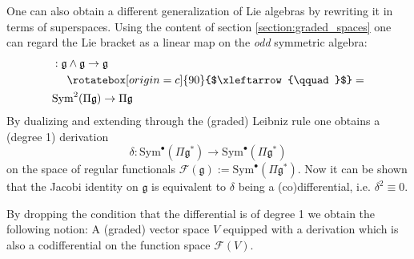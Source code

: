 	One can also obtain a different generalization of Lie algebras by rewriting it in terms of superspaces. Using the content of section \ref{section:graded_spaces} one can regard the Lie bracket as a linear map on the \textit{odd} symmetric algebra:
	\begin{align*}
		[\cdot,\cdot]&:\mathfrak{g}\wedge\mathfrak{g}\rightarrow\mathfrak{g}\\
		&\quad\ \rotatebox[origin=c]{90}{$\xleftarrow{\qquad}$}=\\
		&\text{Sym}^2(\Pi\mathfrak{g})\rightarrow\Pi\mathfrak{g}
	\end{align*}
	By dualizing and extending through the (graded) Leibniz rule one obtains a (degree 1) derivation \[\delta:\text{Sym}^\bullet(\Pi\mathfrak{g}^*)\rightarrow\text{Sym}^\bullet(\Pi\mathfrak{g}^*)\] on the space of regular functionals $\mathcal{F}(\mathfrak{g}):=\text{Sym}^\bullet(\Pi\mathfrak{g}^*)$. Now it can be shown that the Jacobi identity on $\mathfrak{g}$ is equivalent to $\delta$ being a (co)differential, i.e. $\delta^2\equiv0$.
	
	
	By dropping the condition that the differential is of degree 1 we obtain the following notion:	A (graded) vector space $V$ equipped with a derivation which is also a codifferential on the function space $\mathcal{F}(V)$.
		
